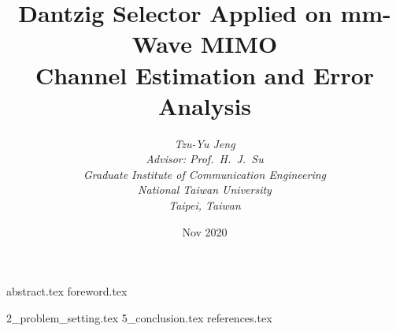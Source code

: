 \documentclass [a4paper, 12pt, twoside, openright] {book}
\begin{document}
\title{
   \textbf {Dantzig Selector Applied on mm-Wave MIMO} \\ \bigskip
   \textbf {Channel Estimation and Error Analysis}
}


\author{
   {\it Tzu-Yu Jeng} \\ \bigskip
   {\it Advisor: Prof.\ H.\ J.\ Su} \\ \bigskip
   {\it Graduate Institute of Communication Engineering} \\ \bigskip
   {\it National Taiwan University} \\ \bigskip
   {\it Taipei, Taiwan}
}

{\date{Nov 2020}}

\maketitle

\frontmatter
 {abstract.tex}
 {foreword.tex}
\tableofcontents
\listoffigures
\listoftables


\mainmatter

 {2_problem_setting.tex}
 {5_conclusion.tex}
 {references.tex}
\end{document}
